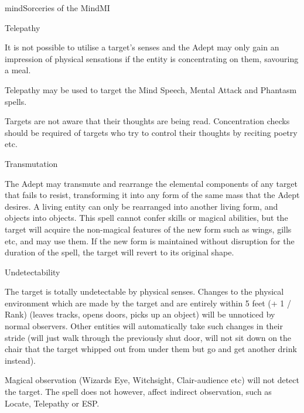 \begin{college}[1.6]{mind}{Sorceries of the Mind}{MI}
\begin{spell}[S-9]{Telepathy}
\begin{effects}
It is not possible to utilise a target's senses and the Adept may only
gain an impression of physical sensations if the entity is
concentrating on them, \eg savouring a meal.

Telepathy may be used to target the Mind Speech, Mental Attack and
Phantasm spells.

Targets are not aware that their thoughts are being read.
Concentration checks should be required of targets who try to control
their thoughts by reciting poetry etc.
\end{effects}
\end{spell}

\begin{spell}[S-10]{Transmutation}

\begin{effects}
The Adept may transmute and rearrange the elemental components of any
target that fails to resist, transforming it into any form of the same
mass that the Adept desires. A living entity can only be rearranged
into another living form, and objects into objects. This spell cannot
confer skills or magical abilities, but the target will acquire the
non-magical features of the new form such as wings, gills etc, and may
use them. If the new form is maintained without disruption for the
duration of the spell, the target will revert to its original shape.
\end{effects}
\end{spell}

\begin{spell}[S-11]{Undetectability}

\begin{effects}
The target is totally undetectable by physical senses. Changes to the
physical environment which are made by the target and are entirely
within 5 feet (+ 1 / Rank) (\eg leaves tracks, opens doors, picks up
an object) will be unnoticed by normal observers. Other entities will
automatically take such changes in their stride (\eg will just walk
through the previously shut door, will not sit down on the chair that
the target whipped out from under them but go and get another drink
instead).

Magical observation (Wizards Eye, Witchsight, Clair-audience etc) will
not detect the target. The spell does not however, affect indirect
observation, such as Locate, Telepathy or ESP.


\end{effects}
\end{spell}
\end{college}
